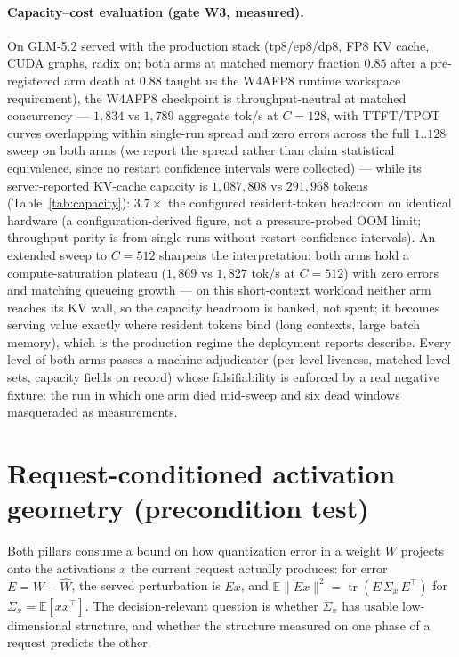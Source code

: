 \documentclass[11pt]{article}
\renewcommand{\_}{\WCorigunderscore\allowbreak}
\begin{document}
\paragraph{Capacity--cost evaluation (gate W3, measured).}
On GLM-5.2 served with the production stack (tp8/ep8/dp8, FP8 KV
cache, CUDA graphs, radix on; both arms at matched memory fraction
$0.85$ after a pre-registered arm death at $0.88$ taught us the W4AFP8
runtime workspace requirement), the W4AFP8 checkpoint is
throughput-neutral at matched concurrency --- $1{,}834$ vs $1{,}789$
aggregate tok/s at $C{=}128$, with TTFT/TPOT curves overlapping within
single-run spread and zero errors across the full $1..128$ sweep on both
arms (we report the spread rather than claim statistical equivalence,
since no restart confidence intervals were collected) ---
while its server-reported KV-cache capacity is $1{,}087{,}808$ vs
$291{,}968$ tokens (Table~\ref{tab:capacity}): $3.7\times$ the
configured resident-token headroom on identical hardware (a configuration-derived figure, not a
pressure-probed OOM limit; throughput parity is from single runs
without restart confidence intervals). An extended sweep to $C{=}512$
sharpens the interpretation: both arms hold a compute-saturation
plateau ($1{,}869$ vs $1{,}827$ tok/s at $C{=}512$) with zero errors
and matching queueing growth --- on this short-context workload neither arm reaches its KV
wall, so the capacity headroom is banked, not spent; it becomes
serving value exactly where resident tokens bind (long contexts, large
batch memory), which is the production regime the deployment reports
describe. Every level of both arms passes a machine adjudicator
(per-level liveness, matched level sets, capacity fields on record)
whose falsifiability is enforced by a real negative fixture: the run
in which one arm died mid-sweep and six dead windows masqueraded as
measurements.


\section{Request-conditioned activation geometry (precondition test)}
\label{app:geometry}
Both pillars consume a bound on how quantization error in a weight $W$
projects onto the activations $x$ the current request actually
produces: for error $E=W-\widehat W$, the served perturbation is $Ex$,
and $\mathbb E\|Ex\|^2 = \operatorname{tr}(E\,\Sigma_x\,E^\top)$ for
$\Sigma_x=\mathbb E[xx^\top]$. The decision-relevant question is
whether $\Sigma_x$ has usable low-dimensional structure, and whether
the structure measured on one phase of a request predicts the other.
\end{document}
